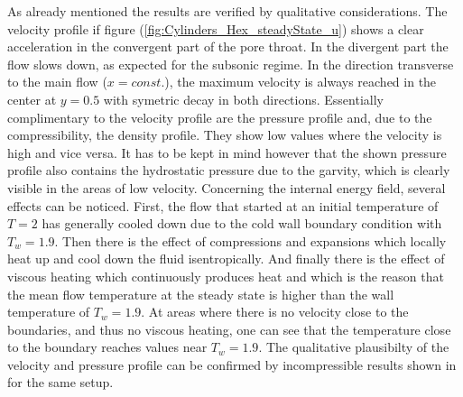 \documentclass{report}
\begin{document}
As already mentioned the results are verified by qualitative considerations. 
The velocity profile if figure (\ref{fig:Cylinders_Hex_steadyState_u}) shows a clear acceleration in the convergent part of the pore throat. In the divergent part the flow slows down, as expected for the subsonic regime. In the direction transverse to the main flow ($x=const.$), the maximum velocity is always reached in the center at $y=0.5$ with symetric decay in both directions. 
Essentially complimentary to the velocity profile are the pressure profile and, due to the compressibility, the density profile. They show low values where the velocity is high and vice versa. It has to be kept in mind however that the shown pressure profile also contains the hydrostatic pressure due to the garvity, which is clearly visible in the areas of low velocity.
Concerning the internal energy field, several effects can be noticed. First, the flow that started at an initial temperature of $T=2$ has generally cooled down due to the cold wall boundary condition with $T_w=1.9$. Then there is the effect of compressions and expansions which locally heat up and cool down the fluid isentropically. And finally there is the effect of viscous heating which continuously produces heat and which is the reason that the mean flow temperature at the steady state is higher than the wall temperature of $T_w=1.9$. At areas where there is no velocity close to the boundaries, and thus no viscous heating, one can see that the temperature close to the boundary reaches values near $T_w=1.9$. %
The qualitative plausibilty of the velocity and pressure profile can be confirmed by incompressible results shown in \cite{Zhu1999} for the same setup. 
 
\end{document}
